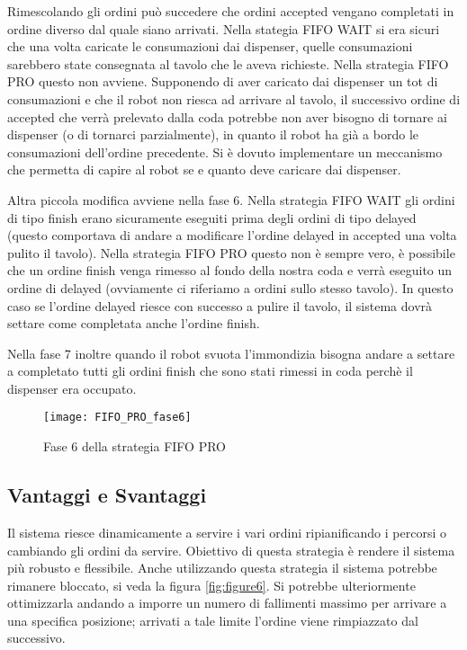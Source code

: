 Rimescolando gli ordini può succedere che ordini accepted vengano completati in ordine diverso dal quale siano arrivati. Nella stategia FIFO WAIT si era sicuri che una volta caricate le consumazioni dai dispenser, quelle consumazioni sarebbero state consegnata al tavolo che le aveva richieste. Nella strategia FIFO PRO questo non avviene. Supponendo di aver caricato dai dispenser un tot di consumazioni e che il robot non riesca ad arrivare al tavolo, il successivo ordine di accepted che verrà prelevato dalla coda potrebbe non aver bisogno di tornare ai dispenser (o di tornarci parzialmente), in quanto il robot ha già a bordo le consumazioni dell'ordine precedente. Si è dovuto implementare un meccanismo che permetta di capire al robot se e quanto deve caricare dai dispenser.

Altra piccola modifica avviene nella fase 6. Nella strategia FIFO WAIT gli ordini di tipo finish erano sicuramente eseguiti prima degli ordini di tipo delayed (questo comportava di andare a modificare l'ordine delayed in accepted una volta pulito il tavolo). Nella strategia FIFO PRO questo non è sempre vero, è possibile che un ordine finish venga rimesso al fondo della nostra coda e verrà eseguito un ordine di delayed (ovviamente ci riferiamo a ordini sullo stesso tavolo). In questo caso se l'ordine delayed riesce con successo a pulire il tavolo, il sistema dovrà settare come completata anche l'ordine finish.

Nella fase 7 inoltre quando il robot svuota l'immondizia bisogna andare a settare a completato tutti gli ordini finish che sono stati rimessi in coda perchè il dispenser era occupato.

\begin{figure}[htp]
  \texttt{[image: FIFO\_PRO\_fase6]}
  \caption{Fase 6 della strategia FIFO PRO}
  \label{fig:figure5}
\end{figure}

\subsection{Vantaggi e Svantaggi}
Il sistema riesce dinamicamente a servire i vari ordini ripianificando i percorsi o cambiando gli ordini da servire. Obiettivo di questa strategia è rendere il sistema più robusto e flessibile.
Anche utilizzando questa strategia il sistema potrebbe rimanere bloccato, si veda la figura \ref{fig:figure6}. Si potrebbe ulteriormente ottimizzarla andando a imporre un numero di fallimenti massimo per arrivare a una specifica posizione; arrivati a tale limite l'ordine viene rimpiazzato dal successivo.


